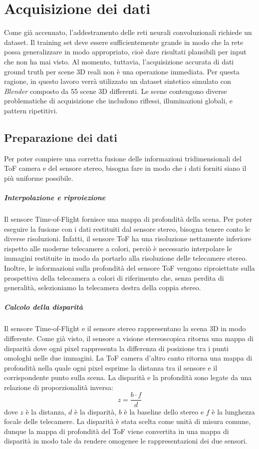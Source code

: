 \chapter{Acquisizione dei dati}
Come già accennato, l'addestramento delle reti neurali convoluzionali richiede un dataset. Il training set deve essere sufficientemente grande in modo che la rete possa generalizzare in modo appropriato, cioè dare risultati plausibili per input che non ha mai visto. Al momento, tuttavia, l'acquisizione accurata di dati ground truth per scene 3D reali non è una operazione immediata. Per questa ragione, in questo lavoro verrà utilizzato un dataset sintetico simulato con \textit{Blender} composto da 55 scene 3D differenti. Le scene contengono diverse problematiche di acquisizione che includono riflessi, illuminazioni globali, e pattern ripetitivi. 

\section{Preparazione dei dati}
Per poter compiere una corretta fusione delle informazioni tridimensionali del ToF camera e del sensore stereo, bisogna fare in modo che i dati forniti siano il più uniforme possibile.

\paragraph{Interpolazione e riproiezione}
Il sensore Time-of-Flight fornisce una mappa di profondità della scena. Per poter eseguire la fusione con i dati restituiti dal sensore stereo, bisogna tenere conto le diverse risoluzioni. Infatti, il sensore ToF ha una risoluzione nettamente inferiore rispetto alle moderne telecamere a colori, perciò è necessario interpolare le immagini restituite in modo da portarlo alla risoluzione delle telecamere stereo.\\
Inoltre, le informazioni sulla profondità del sensore ToF vengono riproiettate sulla prospettiva della telecamera a colori di riferimento che, senza perdita di generalità, selezioniamo la telecamera destra della coppia stereo. 

\paragraph{Calcolo della disparità}
Il sensore Time-of-Flight e il sensore stereo rappresentano la scena 3D in modo differente. Come già visto, il sensore a visione stereoscopica ritorna una mappa di disparità dove ogni pixel rappresenta la differenza di posizione tra i punti omologhi nelle due immagini. La ToF camera d'altro canto ritorna una mappa di profondità nella quale ogni pixel esprime la distanza tra il sensore e il corrispondente punto sulla scena. La disparità e la profondità sono legate da una relazione di proporzionalità inversa:
$$z=\frac{b\cdot f}{d}$$
dove $z$ è la distanza, $d$ è la disparità, $b$ è la baseline dello stereo e $f$ è la lunghezza focale delle telecamere. La disparità è stata scelta come unità di misura comune, dunque la mappa di profondità del ToF viene convertita in una mappa di disparità in modo tale da rendere omogenee le rappresentazioni dei due sensori.

